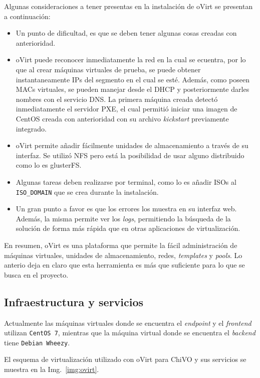 Algunas consideraciones a tener presentas en la instalación de oVirt se presentan a continuación:

\begin{itemize}
	\item Un punto de dificultad, es que se deben tener algunas cosas creadas con anterioridad.
	\item oVirt puede reconocer inmediatamente la red en la cual se ecuentra, por lo que al crear máquinas virtuales de prueba, se puede obtener instantaneamente IPs del segmento en el cual se est\'e. Además, como poseen MACs virtuales, se pueden manejar desde el DHCP y posteriormente darles nombres con el servicio DNS. La primera máquina creada detectó inmediatamente el servidor PXE, el cual permitió iniciar una imagen de CentOS creada con anterioridad con su archivo \emph{kickstart} previamente integrado.
	\item oVirt permite añadir fácilmente unidades de almacenamiento a trav\'es de su interfaz. Se utilizó NFS pero está la posibilidad de usar alguno distribuido como lo es glusterFS.
	\item Algunas tareas deben realizarse por terminal, como lo es añadir ISOs al \verb;ISO_DOMAIN; que se crea durante la instalación.
	\item Un gran punto a favor es que los errores los muestra en su interfaz web. Además, la misma permite ver los \emph{logs}, permitiendo la búsqueda de la solución de forma más rápida que en otras aplicaciones de virtualización.
\end{itemize}

En resumen, oVirt es una plataforma que permite la fácil administración de máquinas virtuales, unidades de almacenamiento, redes, \emph{templates} y \emph{pools}. Lo anterio deja en claro que esta herramienta es más que suficiente para lo que se busca en el proyecto.

\subsection*{Infraestructura y servicios}

Actualmente las máquinas virtuales donde se encuentra el \emph{endpoint} y el \emph{frontend} utilizan \verb;CentOS 7;, mientras que la máquina virtual donde se encuentra el \emph{backend} tiene \verb;Debian Wheezy;. 

El esquema de virtualización utilizado con oVirt para ChiVO y sus servicios se muestra en la Img.~\ref{img:ovirt}.

